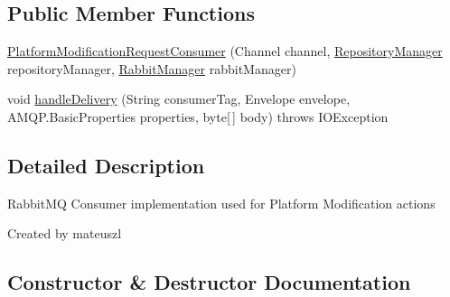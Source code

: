 \subsection*{Public Member Functions}
\begin{DoxyCompactItemize}
\item 
\hyperlink{classeu_1_1h2020_1_1symbiote_1_1messaging_1_1PlatformModificationRequestConsumer_a68aef30b8dec1bfee5049027aadb0d28}{Platform\+Modification\+Request\+Consumer} (Channel channel, \hyperlink{classeu_1_1h2020_1_1symbiote_1_1repository_1_1RepositoryManager}{Repository\+Manager} repository\+Manager, \hyperlink{classeu_1_1h2020_1_1symbiote_1_1messaging_1_1RabbitManager}{Rabbit\+Manager} rabbit\+Manager)
\item 
void \hyperlink{classeu_1_1h2020_1_1symbiote_1_1messaging_1_1PlatformModificationRequestConsumer_abd849a1e55f280762f4571d4214004a3}{handle\+Delivery} (String consumer\+Tag, Envelope envelope, A\+M\+Q\+P.\+Basic\+Properties properties, byte\mbox{[}$\,$\mbox{]} body)  throws I\+O\+Exception 
\end{DoxyCompactItemize}


\subsection{Detailed Description}
Rabbit\+MQ Consumer implementation used for Platform Modification actions

Created by mateuszl 

\subsection{Constructor \& Destructor Documentation}
